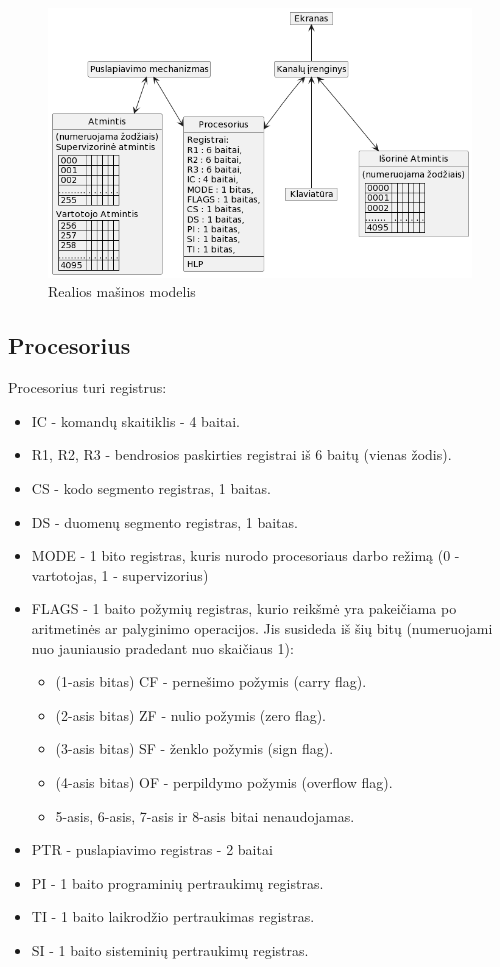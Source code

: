 \documentclass{VUMIFInfKursinis}
\begin{document}
\begin{figure}[H]
	\centering	
	\includegraphics[scale=0.65]{img/reali_masina}
	\caption{Realios mašinos modelis}   %
	\label{img:reali_masina}
\end{figure}

\subsection{Procesorius}

Procesorius turi registrus:

\begin{itemize}
	\item IC - komandų skaitiklis - 4 baitai.
	\item R1, R2, R3 - bendrosios paskirties registrai iš 6 baitų (vienas žodis).
	\item CS - kodo segmento registras, 1 baitas.
	\item DS - duomenų segmento registras, 1 baitas.
	\item MODE - 1 bito registras, kuris nurodo procesoriaus darbo režimą (0 - vartotojas, 1 - supervizorius)
	\item FLAGS - 1 baito požymių registras, kurio reikšmė yra pakeičiama po aritmetinės ar palyginimo operacijos. Jis susideda iš šių bitų (numeruojami nuo jauniausio pradedant nuo skaičiaus 1): 
	\begin{itemize}
		\item (1-asis bitas) CF - pernešimo požymis (carry flag).
		\item (2-asis bitas) ZF - nulio požymis (zero flag).
		\item (3-asis bitas) SF - ženklo požymis (sign flag).
		\item (4-asis bitas) OF - perpildymo požymis (overflow flag).
		\item 5-asis, 6-asis, 7-asis ir 8-asis bitai nenaudojamas.
	\end{itemize}
	\item PTR - puslapiavimo registras - 2 baitai
	\item PI - 1 baito programinių pertraukimų registras.
	\item TI - 1 baito laikrodžio pertraukimas registras.
	\item SI - 1 baito sisteminių pertraukimų registras.
\end{itemize}
\end{document}
